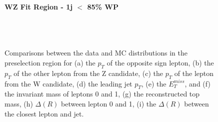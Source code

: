 \begin{figure}[H] 
    \centering
    \textbf{WZ Fit Region - 1j $<$ 85\% WP}\\
    \\
    \\
    \\ 
    \caption{Comparisons between the data and MC distributions in the preselection region for (a) the $p_T$ of the opposite sign lepton, (b) the $p_T$ of the other lepton from the Z candidate, (c) the $p_T$ of the lepton from the W candidate, (d) the leading jet $p_T$, (e) the $E_T^{miss}$, and (f) the invariant mass of leptons 0 and 1, (g) the reconstructed top mass, (h) $\Delta(R)$  between lepton 0 and 1, (i) the $\Delta(R)$ between the closest lepton and jet.}
    \label{kin:WP_1j_not85}
\end{figure}

